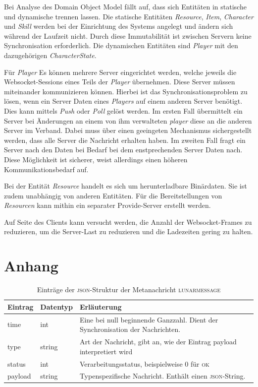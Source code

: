\documentclass[ngerman,11pt]{report}
\begin{document}
Bei Analyse des Domain Object Model fällt auf, dass sich Entitäten in statische und dynamische
trennen lassen. Die statische Entitäten \textit{Resource}, \textit{Item}, \textit{Character}
und \textit{Skill} werden bei der Einrichtung des Systems angelegt und ändern sich während der
Laufzeit nicht. Durch diese Immutabilität ist zwischen Servern keine Synchronisation erforderlich.
Die dynamischen Entitäten sind \textit{Player} mit den dazugehörigen \textit{CharacterState}.

Für \textit{Player} Es können mehrere Server eingerichtet werden, welche jeweils die Websocket-Sessions eines Teils der \textit{Player} übernehmen. Diese Server müssen miteinander kommunizieren können.
Hierbei ist das Synchronisationsproblem zu lösen, wenn ein Server Daten eines \textit{Players} auf
einem anderen Server benötigt. Dies kann mittels \textit{Push} oder \textit{Poll} gelöst werden.
Im ersten Fall übermittelt ein Server bei Änderungen an einem von ihm verwalteten \textit{player}
diese an die anderen Server im Verband. Dabei muss über einen geeingeten Mechanismus sichergestellt
werden, dass alle Server die Nachricht erhalten haben. Im zweiten Fall fragt ein Server nach den
Daten bei Bedarf bei dem enstprechenden Server Daten nach. Diese Möglichkeit ist sicherer, 
weist allerdings einen höheren Kommunikationsbedarf auf.

Bei der Entität \textit{Resource} handelt es sich um herunterladbare Binärdaten. Sie ist zudem
unabhängig von anderen Entitäten. Für die Bereitstellungen von \textit{Resourcen} kann mithin
ein separater Provide-Server erstellt werden.

Auf Seite des Clients kann versucht werden, die Anzahl der Websocket-Frames zu reduzieren, um
die Server-Last zu reduzieren und die Ladezeiten gering zu halten.

\chapter{Anhang}

\begin{table}[]
\centering
\caption{Einträge der \textsc{json}-Struktur der Metanachricht \textsc{lunarmessage}}
\label{table:lunarmessage}
\begin{tabularx}{\textwidth}{l|l|X}
Eintrag & Datentyp & Erläuterung \\ \hline
time    & int    & Eine bei null beginnende Ganzzahl. Dient der Synchronisation der Nachrichten. \\
type    & string & Art der Nachricht, gibt an, wie der Eintrag payload interpretiert wird  \\
status  & int    & Verarbeitungsstatus, beispielweise 0 für \textsc{ok}                          \\
payload & string & Typenspezifische Nachricht. Enthält einen \textsc{json}-String.       
\end{tabularx}
\end{table}
\end{document}
